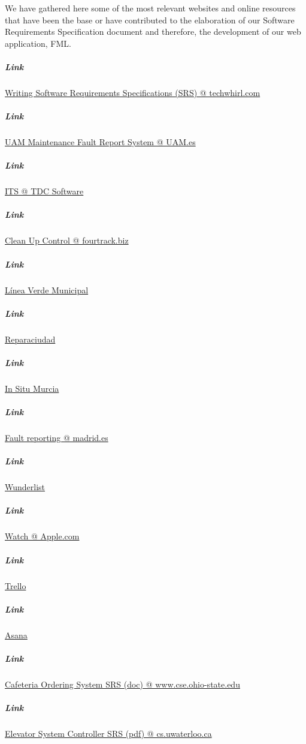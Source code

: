 We have gathered here some of the most relevant websites and online resources that have been the base or have contributed to the elaboration of our Software Requirements Specification document and therefore, the development of our web application, FML.

\subparagraph{Link} \href{http://techwhirl.com/writing-software-requirements-specifications/}{Writing Software Requirements Specifications (SRS) @ techwhirl.com}

\subparagraph{Link} \href{http://www.uam.es/ss/Satellite/es/1234886352057/1242647722813/servicio/servicio/Servicio_de_Mantenimiento.htm}{UAM Maintenance Fault Report System @ UAM.es}

\subparagraph{Link}\href{http://www.tdcsoftware.com/?q=en/node/15}{ITS @ TDC Software}

\subparagraph{Link}\href{http://www.fourtrack.biz/documents/castella/Clean-Up%20Control.pdf}{Clean Up Control @ fourtrack.biz}

\subparagraph{Link} \href{http://www.lineaverdemunicipal.com/Default.aspx}{Línea Verde Municipal}

\subparagraph{Link} \href{http://reparaciudad.com}{Reparaciudad}

\subparagraph{Link} \href{http://www.insitumurcia.es}{In Situ Murcia}

\subparagraph{Link} \href{https://sede.madrid.es/portal/site/tramites/menuitem.77902acb5cdfe761e8e4e8e4ecd08a0c/?vgnextoid=ce5ea38813180210VgnVCM100000c90da8c0RCRD}{Fault reporting @ madrid.es}

\subparagraph{Link} \href{http://wunderlist.com}{Wunderlist}

\subparagraph{Link} \href{https://www.apple.com/watch/}{Watch @ Apple.com}

\subparagraph{Link} \href{http://trello.com}{Trello}

\subparagraph{Link} \href{http://asana.com}{Asana}

\subparagraph{Link} \href{https://www.google.es/url?sa=t&rct=j&q=&esrc=s&source=web&cd=7&cad=rja&uact=8&ved=0CFsQFjAG&url=http%3A%2F%2Fwww.cse.ohio-state.edu%2F~igorm%2FCSE762%2FSP11%2FDocumentation%2FTemplates%2FCOS_SRS.doc&ei=aGbqVN3aBYHmUp-MgrgB&usg=AFQjCNFe2qSNcCKqmKozUPIb-N7_kGc3tA&sig2=09OHiEy6sOYQ88Ns_Xu_pQ&bvm=bv.86475890,d.d24}{Cafeteria Ordering System SRS (doc) @ www.cse.ohio-state.edu}

\subparagraph{Link} \href{https://cs.uwaterloo.ca/~dberry/ATRE/ElevatorSRSs/FinalSRSes/SRS-Alex-Kalaidjian.pdf}{Elevator System Controller SRS (pdf) @ cs.uwaterloo.ca}